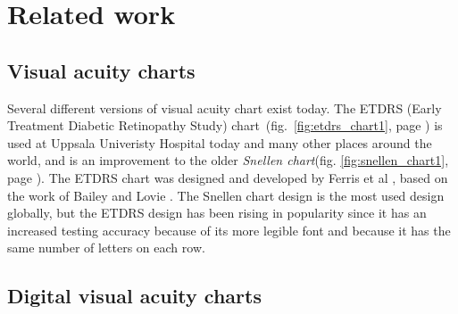 \documentclass[12pt,a4paper,notitlepage]{report}
\begin{document}
\section{Related work}

\subsection{Visual acuity charts}

Several different versions of visual acuity chart exist today. The ETDRS (Early Treatment Diabetic Retinopathy Study) chart~(fig.~\ref{fig:etdrs_chart1}, page \pageref{fig:etdrs_chart1}) is used at Uppsala Univeristy Hospital today and many other places around the world, and is an improvement to the older \textit{Snellen chart}(fig. \ref{fig:snellen_chart1}, page \pageref{fig:snellen_chart1}). The ETDRS chart was designed and developed by Ferris et al \cite{Ferris}, based on the work of Bailey and Lovie \cite{Bailey}. The Snellen chart design is the most used design globally, but the ETDRS design has been rising in popularity since it has an increased testing accuracy because of its more legible font and because it has the same number of letters on each row.



\subsection{Digital visual acuity charts}
\end{document}
